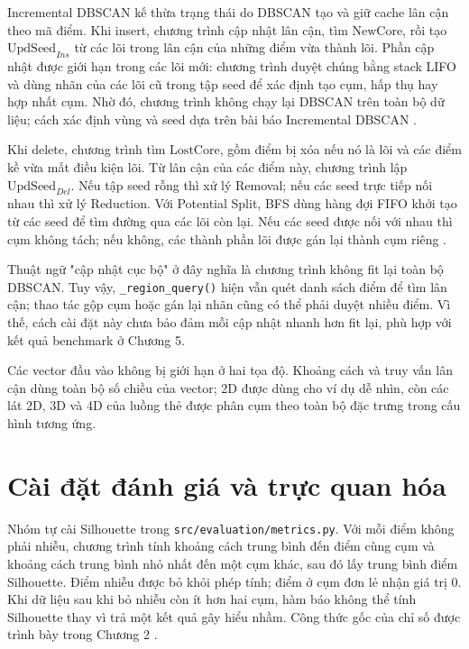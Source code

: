 Incremental DBSCAN kế thừa trạng thái do DBSCAN tạo và giữ cache lân cận theo mã điểm. Khi insert, chương trình cập nhật lân cận, tìm \(\mathrm{NewCore}\), rồi tạo \(\mathrm{UpdSeed}_{Ins}\) từ các lõi trong lân cận của những điểm vừa thành lõi. Phần cập nhật được giới hạn trong các lõi mới: chương trình duyệt chúng bằng stack LIFO và dùng nhãn của các lõi cũ trong tập seed để xác định tạo cụm, hấp thụ hay hợp nhất cụm. Nhờ đó, chương trình không chạy lại DBSCAN trên toàn bộ dữ liệu; cách xác định vùng và seed dựa trên bài báo Incremental DBSCAN \parencite{ester1998incrementaldbscan}.

Khi delete, chương trình tìm \(\mathrm{LostCore}\), gồm điểm bị xóa nếu nó là lõi và các điểm kề vừa mất điều kiện lõi. Từ lân cận của các điểm này, chương trình lập \(\mathrm{UpdSeed}_{Del}\). Nếu tập seed rỗng thì xử lý Removal; nếu các seed trực tiếp nối nhau thì xử lý Reduction. Với Potential Split, BFS dùng hàng đợi FIFO khởi tạo từ các seed để tìm đường qua các lõi còn lại. Nếu các seed được nối với nhau thì cụm không tách; nếu không, các thành phần lõi được gán lại thành cụm riêng \parencite{ester1998incrementaldbscan,mitBFSConnectedComponents}.

Thuật ngữ "cập nhật cục bộ" ở đây nghĩa là chương trình không fit lại toàn bộ DBSCAN. Tuy vậy, \texttt{\_region\_query()} hiện vẫn quét danh sách điểm để tìm lân cận; thao tác gộp cụm hoặc gán lại nhãn cũng có thể phải duyệt nhiều điểm. Vì thế, cách cài đặt này chưa bảo đảm mỗi cập nhật nhanh hơn fit lại, phù hợp với kết quả benchmark ở Chương 5.

Các vector đầu vào không bị giới hạn ở hai tọa độ. Khoảng cách và truy vấn lân cận dùng toàn bộ số chiều của vector; 2D được dùng cho ví dụ dễ nhìn, còn các lát 2D, 3D và 4D của luồng thẻ được phân cụm theo toàn bộ đặc trưng trong cấu hình tương ứng.

\section{Cài đặt đánh giá và trực quan hóa}

Nhóm tự cài Silhouette trong \texttt{src/evaluation/metrics.py}. Với mỗi điểm không phải nhiễu, chương trình tính khoảng cách trung bình đến điểm cùng cụm và khoảng cách trung bình nhỏ nhất đến một cụm khác, sau đó lấy trung bình điểm Silhouette. Điểm nhiễu được bỏ khỏi phép tính; điểm ở cụm đơn lẻ nhận giá trị 0. Khi dữ liệu sau khi bỏ nhiễu còn ít hơn hai cụm, hàm báo không thể tính Silhouette thay vì trả một kết quả gây hiểu nhầm. Công thức gốc của chỉ số được trình bày trong Chương 2 \parencite{rousseeuw1987silhouette}.

